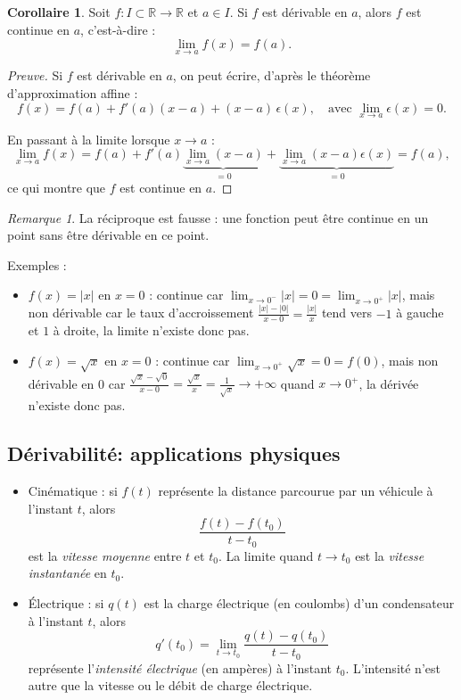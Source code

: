 \documentclass{report} %
\theoremstyle{definition}  %
\newtheorem{corollary}{Corollaire}[chapter] %
\theoremstyle{plain} %
\theoremstyle{remark} %
\newtheorem*{remark}{Remarque} %
\begin{document}
\medskip

\begin{corollary}
Soit \(f : I \subset \mathbb{R} \to \mathbb{R}\) et \(a \in I\).  
Si \(f\) est dérivable en \(a\), alors \(f\) est continue en \(a\), c'est-à-dire :
\[
\lim_{x \to a} f(x) = f(a).
\]
\end{corollary}

\begin{proof}[Preuve]
Si \(f\) est dérivable en \(a\), on peut écrire, d'après le théorème d'approximation affine :
\[
f(x) = f(a) + f'(a)(x-a) + (x-a)\,\epsilon(x), \quad \text{avec } \lim_{x \to a} \epsilon(x) = 0.
\]

En passant à la limite lorsque \(x \to a\) :
\[
\lim_{x \to a} f(x) = f(a) + f'(a)\underbrace{\lim_{x \to a} (x-a)}_{=0} + \underbrace{\lim_{x \to a} (x-a)\epsilon(x)}_{=0} = f(a),
\]
ce qui montre que \(f\) est continue en \(a\).
\end{proof}

\begin{remark}
La réciproque est fausse : une fonction peut être continue en un point sans être dérivable en ce point.  

\medskip
\noindent
Exemples :
\begin{itemize}
    \item \(f(x) = |x|\) en \(x=0\) : continue car \(\lim_{x \to 0^-} |x| = 0 = \lim_{x \to 0^+} |x|\), mais non dérivable car le taux d'accroissement
    \(\frac{|x|-|0|}{x-0} = \frac{|x|}{x}\) tend vers \(-1\) à gauche et \(1\) à droite, la limite n'existe donc pas.
    
    \item \(f(x) = \sqrt{x}\) en \(x=0\) : continue car \(\lim_{x \to 0^+} \sqrt{x} = 0 = f(0)\), mais non dérivable en 0 car
    \(\frac{\sqrt{x}-\sqrt{0}}{x-0} = \frac{\sqrt{x}}{x} = \frac{1}{\sqrt{x}} \to +\infty\) quand \(x \to 0^+\), la dérivée n'existe donc pas.
\end{itemize}
\end{remark}

\medskip

\subsection{Dérivabilité: applications physiques}

\begin{itemize}
    \item Cinématique : si \(f(t)\) représente la distance parcourue par un véhicule à l'instant \(t\), alors
    \[
    \frac{f(t)-f(t_0)}{t-t_0}
    \]
    est la \emph{vitesse moyenne} entre \(t\) et \(t_0\). La limite quand \(t \to t_0\) est la \emph{vitesse instantanée} en \(t_0\).

    \item Électrique : si \(q(t)\) est la charge électrique (en coulombs) d'un condensateur à l'instant \(t\), alors
    \[
    q'(t_0) = \lim_{t \to t_0} \frac{q(t)-q(t_0)}{t-t_0}
    \]
    représente l'\emph{intensité électrique} (en ampères) à l'instant \(t_0\).  
    L'intensité n'est autre que la vitesse ou le débit de charge électrique.
\end{itemize}
\end{document}
